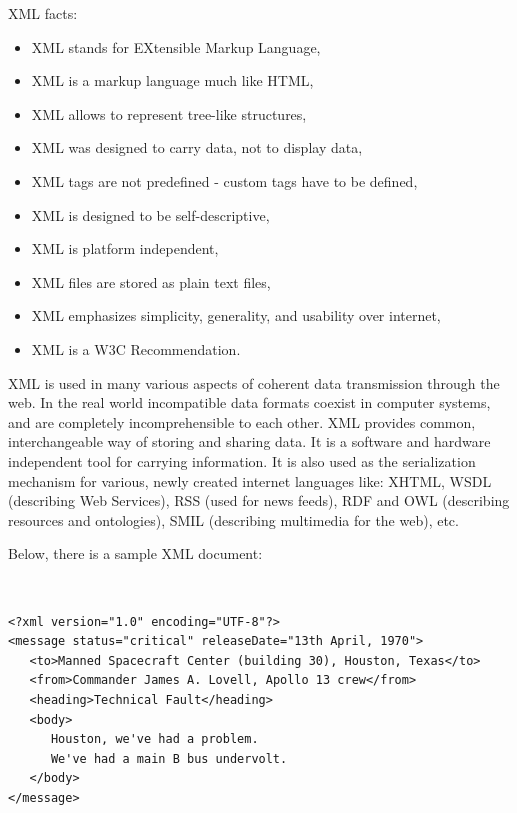 \bigskip

\noindent XML facts:
\begin{itemize}
    \setlength{\itemsep}{0cm}
    \setlength{\parskip}{0cm}

    \item XML stands for EXtensible Markup Language,
    \item XML is a markup language much like HTML,
    \item XML allows to represent tree-like structures,
    \item XML was designed to carry data, not to display data,
    \item XML tags are not predefined - custom tags have to be defined,
    \item XML is designed to be self-descriptive,
    \item XML is platform independent,
    \item XML files are stored as plain text files,
    \item XML emphasizes simplicity, generality, and usability over internet,
    \item XML is a W3C Recommendation.
\end{itemize}

\noindent XML is used in many various aspects of coherent data transmission through the web. In the real world incompatible data formats coexist in computer systems, and are completely incomprehensible to each other. XML provides common, interchangeable way of storing and sharing data. It is a software and hardware independent tool for carrying information. It is also used as the serialization mechanism for various, newly created internet languages like: XHTML, WSDL (describing Web Services), RSS (used for news feeds), RDF and OWL (describing resources and ontologies), SMIL (describing multimedia for the web), etc.

\newpage

\noindent Below, there is a sample XML document:

{\tt \small
\begin{verbatim}
<?xml version="1.0" encoding="UTF-8"?>
<message status="critical" releaseDate="13th April, 1970">
   <to>Manned Spacecraft Center (building 30), Houston, Texas</to>
   <from>Commander James A. Lovell, Apollo 13 crew</from>
   <heading>Technical Fault</heading>
   <body>
      Houston, we've had a problem. 
      We've had a main B bus undervolt.
   </body>
</message>
\end{verbatim}
}

